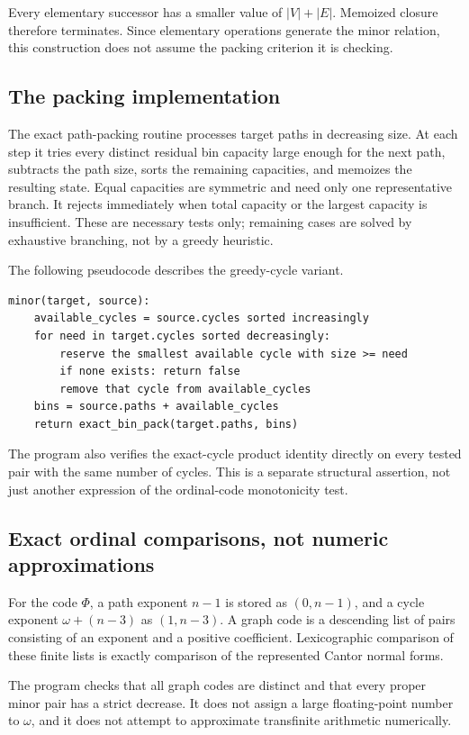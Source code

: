\documentclass[11pt,letterpaper]{article}
\theoremstyle{plain}
\theoremstyle{definition}
\theoremstyle{remark}
\begin{document}
Every elementary successor has a smaller value of $|V|+|E|$.
Memoized closure therefore terminates. Since elementary operations
generate the minor relation, this construction does not assume the
packing criterion it is checking.

\subsection{The packing implementation}

The exact path-packing routine processes target paths in decreasing
size. At each step it tries every distinct residual bin capacity
large enough for the next path, subtracts the path size, sorts the
remaining capacities, and memoizes the resulting state. Equal
capacities are symmetric and need only one representative branch.
It rejects immediately when total capacity or the largest capacity
is insufficient. These are necessary tests only; remaining cases
are solved by exhaustive branching, not by a greedy heuristic.

The following pseudocode describes the greedy-cycle variant.
\begin{lstlisting}
minor(target, source):
    available_cycles = source.cycles sorted increasingly
    for need in target.cycles sorted decreasingly:
        reserve the smallest available cycle with size >= need
        if none exists: return false
        remove that cycle from available_cycles
    bins = source.paths + available_cycles
    return exact_bin_pack(target.paths, bins)
\end{lstlisting}

The program also verifies the exact-cycle product identity directly
on every tested pair with the same number of cycles. This is a
separate structural assertion, not just another expression of the
ordinal-code monotonicity test.

\subsection{Exact ordinal comparisons, not numeric approximations}

For the code $\Phi$, a path exponent $n-1$ is stored as $(0,n-1)$,
and a cycle exponent $\omega+(n-3)$ as $(1,n-3)$. A graph code is
a descending list of pairs consisting of an exponent and a positive
coefficient. Lexicographic comparison of these finite lists is
exactly comparison of the represented Cantor normal forms.

The program checks that all graph codes are distinct and that every
proper minor pair has a strict decrease. It does not assign a large
floating-point number to $\omega$, and it does not attempt to
approximate transfinite arithmetic numerically.
\end{document}
